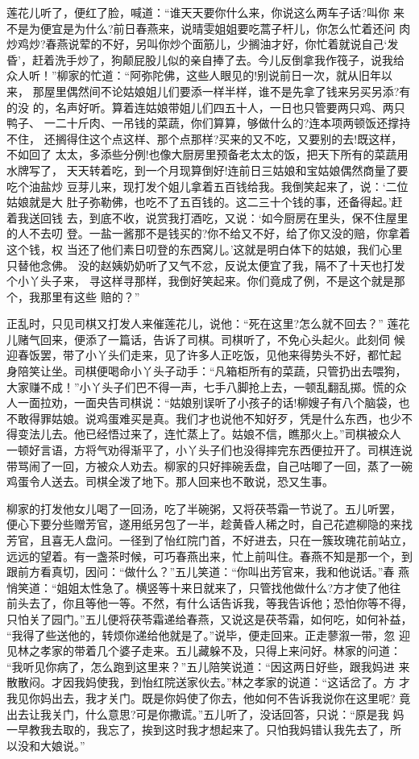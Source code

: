 莲花儿听了，便红了脸，喊道：“谁天天要你什么来，你说这么两车子话?叫你
来不是为便宜是为什么?前日春燕来，说晴雯姐姐要吃蒿子杆儿，你怎么忙着还问
肉炒鸡炒?春燕说荤的不好，另叫你炒个面筋儿，少搁油才好，你忙着就说自己‘发
昏’，赶着洗手炒了，狗颠屁股儿似的亲自捧了去。今儿反倒拿我作筏子，说我给
众人听！”柳家的忙道：“阿弥陀佛，这些人眼见的!别说前日一次，就从旧年以来，
那屋里偶然间不论姑娘姐儿们要添一样半样，谁不是先拿了钱来另买另添?有的没
的，名声好听。算着连姑娘带姐儿们四五十人，一日也只管要两只鸡、两只鸭子、
一二十斤肉、一吊钱的菜蔬，你们算算，够做什么的?连本项两顿饭还撑持不住，
还搁得住这个点这样、那个点那样?买来的又不吃，又要别的去!既这样，不如回了
太太，多添些分例!也像大厨房里预备老太太的饭，把天下所有的菜蔬用水牌写了，
天天转着吃，到一个月现算倒好!连前日三姑娘和宝姑娘偶然商量了要吃个油盐炒
豆芽儿来，现打发个姐儿拿着五百钱给我。我倒笑起来了，说：‘二位姑娘就是大
肚子弥勒佛，也吃不了五百钱的。这二三十个钱的事，还备得起。’赶着我送回钱
去，到底不收，说赏我打酒吃，又说：‘如今厨房在里头，保不住屋里的人不去叨
登。一盐一酱那不是钱买的?你不给又不好，给了你又没的赔，你拿着这个钱，权
当还了他们素日叨登的东西窝儿。’这就是明白体下的姑娘，我们心里只替他念佛。
没的赵姨奶奶听了又气不忿，反说太便宜了我，隔不了十天也打发个小丫头子来，
寻这样寻那样，我倒好笑起来。你们竟成了例，不是这个就是那个，我那里有这些
赔的？”

正乱时，只见司棋又打发人来催莲花儿，说他：“死在这里?怎么就不回去？”
莲花儿赌气回来，便添了一篇话，告诉了司棋。司棋听了，不免心头起火。此刻伺
候迎春饭罢，带了小丫头们走来，见了许多人正吃饭，见他来得势头不好，都忙起
身陪笑让坐。司棋便喝命小丫头子动手：“凡箱柜所有的菜蔬，只管扔出去喂狗，
大家赚不成！”小丫头子们巴不得一声，七手八脚抢上去，一顿乱翻乱掷。慌的众
人一面拉劝，一面央告司棋说：“姑娘别误听了小孩子的话!柳嫂子有八个脑袋，也
不敢得罪姑娘。说鸡蛋难买是真。我们才也说他不知好歹，凭是什么东西，也少不
得变法儿去。他已经悟过来了，连忙蒸上了。姑娘不信，瞧那火上。”司棋被众人
一顿好言语，方将气劝得渐平了，小丫头子们也没得摔完东西便拉开了。司棋连说
带骂闹了一回，方被众人劝去。柳家的只好摔碗丢盘，自己咕唧了一回，蒸了一碗
鸡蛋令人送去。司棋全泼了地下。那人回来也不敢说，恐又生事。

柳家的打发他女儿喝了一回汤，吃了半碗粥，又将茯苓霜一节说了。五儿听罢，
便心下要分些赠芳官，遂用纸另包了一半，趁黄昏人稀之时，自己花遮柳隐的来找
芳官，且喜无人盘问。一径到了怡红院门首，不好进去，只在一簇玫瑰花前站立，
远远的望着。有一盏茶时候，可巧春燕出来，忙上前叫住。春燕不知是那一个，到
跟前方看真切，因问：“做什么？”五儿笑道：“你叫出芳官来，我和他说话。”春
燕悄笑道：“姐姐太性急了。横竖等十来日就来了，只管找他做什么?方才使了他往
前头去了，你且等他一等。不然，有什么话告诉我，等我告诉他；恐怕你等不得，
只怕关了园门。”五儿便将茯苓霜递给春燕，又说这是茯苓霜，如何吃，如何补益，
“我得了些送他的，转烦你递给他就是了。”说毕，便走回来。正走蓼溆一带，忽
迎见林之孝家的带着几个婆子走来。五儿藏躲不及，只得上来问好。林家的问道：
“我听见你病了，怎么跑到这里来？”五儿陪笑说道：“因这两日好些，跟我妈进
来散散闷。才因我妈使我，到怡红院送家伙去。”林之孝家的说道：“这话岔了。方
才我见你妈出去，我才关门。既是你妈使了你去，他如何不告诉我说你在这里呢?
竟出去让我关门，什么意思?可是你撒谎。”五儿听了，没话回答，只说：“原是我
妈一早教我去取的，我忘了，挨到这时我才想起来了。只怕我妈错认我先去了，所
以没和大娘说。”

